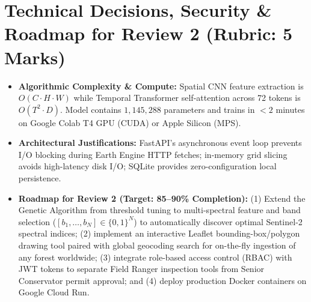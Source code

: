 \documentclass[11pt, a4paper]{article}
\begin{document}
\section{Technical Decisions, Security \& Roadmap for Review 2 (Rubric: 5 Marks)}
\begin{itemize}[noitemsep, topsep=1pt]
    \item \textbf{Algorithmic Complexity \& Compute:} Spatial CNN feature extraction is $O(C \cdot H \cdot W)$ while Temporal Transformer self-attention across 72 tokens is $O(T^2 \cdot D)$. Model contains $1{,}145{,}288$ parameters and trains in $<2$ minutes on Google Colab T4 GPU (CUDA) or Apple Silicon (MPS).
    \item \textbf{Architectural Justifications:} FastAPI's asynchronous event loop prevents I/O blocking during Earth Engine HTTP fetches; in-memory grid slicing avoids high-latency disk I/O; SQLite provides zero-configuration local persistence.
    \item \textbf{Roadmap for Review 2 (Target: 85--90\% Completion):} (1) Extend the Genetic Algorithm from threshold tuning to multi-spectral feature and band selection ($[b_1, \dots, b_N] \in \{0, 1\}^N$) to automatically discover optimal Sentinel-2 spectral indices; (2) implement an interactive Leaflet bounding-box/polygon drawing tool paired with global geocoding search for on-the-fly ingestion of any forest worldwide; (3) integrate role-based access control (RBAC) with JWT tokens to separate Field Ranger inspection tools from Senior Conservator permit approval; and (4) deploy production Docker containers on Google Cloud Run.
\end{itemize}

\vspace{0.1cm}
\renewcommand{\refname}{\normalsize References}


\end{document}

